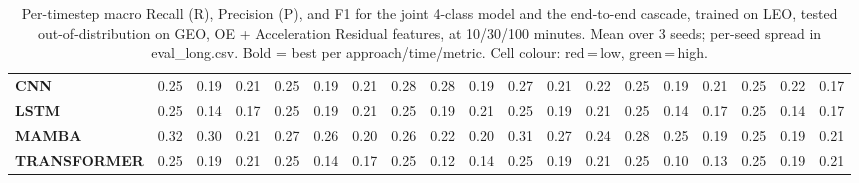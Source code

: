 \begin{table}[t]
{\begin{tabular}{l ccc ccc ccc ccc ccc ccc}
\textbf{CNN} & \cellcolor[HTML]{FF6B6B}0.25 & \cellcolor[HTML]{FF6B6B}0.19 & \cellcolor[HTML]{FF6B6B}0.21 & \cellcolor[HTML]{FF6B6B}0.25 & \cellcolor[HTML]{FF6B6B}0.19 & \cellcolor[HTML]{FF6B6B}0.21 & \cellcolor[HTML]{FF7965}0.28 & \cellcolor[HTML]{FF7A64}0.28 & \cellcolor[HTML]{FF6B6B}0.19 & \cellcolor[HTML]{FF7367}0.27 & \cellcolor[HTML]{FF6B6B}0.21 & \cellcolor[HTML]{FF6B6B}0.22 & \cellcolor[HTML]{FF6B6B}0.25 & \cellcolor[HTML]{FF6B6B}0.19 & \cellcolor[HTML]{FF6B6B}0.21 & \cellcolor[HTML]{FF6B6B}0.25 & \cellcolor[HTML]{FF6B6B}0.22 & \cellcolor[HTML]{FF6B6B}0.17 \\
\textbf{LSTM} & \cellcolor[HTML]{FF6B6B}0.25 & \cellcolor[HTML]{FF6B6B}0.14 & \cellcolor[HTML]{FF6B6B}0.17 & \cellcolor[HTML]{FF6B6B}0.25 & \cellcolor[HTML]{FF6B6B}0.19 & \cellcolor[HTML]{FF6B6B}0.21 & \cellcolor[HTML]{FF6B6B}0.25 & \cellcolor[HTML]{FF6B6B}0.19 & \cellcolor[HTML]{FF6B6B}0.21 & \cellcolor[HTML]{FF6B6B}0.25 & \cellcolor[HTML]{FF6B6B}0.19 & \cellcolor[HTML]{FF6B6B}0.21 & \cellcolor[HTML]{FF6B6B}0.25 & \cellcolor[HTML]{FF6B6B}0.14 & \cellcolor[HTML]{FF6B6B}0.17 & \cellcolor[HTML]{FF6B6B}0.25 & \cellcolor[HTML]{FF6B6B}0.14 & \cellcolor[HTML]{FF6B6B}0.17 \\
\textbf{MAMBA} & \cellcolor[HTML]{FF875E}0.32 & \cellcolor[HTML]{FF8061}0.30 & \cellcolor[HTML]{FF6B6B}0.21 & \cellcolor[HTML]{FF7566}0.27 & \cellcolor[HTML]{FF7069}0.26 & \cellcolor[HTML]{FF6B6B}0.20 & \cellcolor[HTML]{FF7168}0.26 & \cellcolor[HTML]{FF6B6B}0.22 & \cellcolor[HTML]{FF6B6B}0.20 & \cellcolor[HTML]{FF8360}0.31 & \cellcolor[HTML]{FF7567}0.27 & \cellcolor[HTML]{FF6B6B}0.24 & \cellcolor[HTML]{FF7666}0.28 & \cellcolor[HTML]{FF6C6B}0.25 & \cellcolor[HTML]{FF6B6B}0.19 & \cellcolor[HTML]{FF6B6B}0.25 & \cellcolor[HTML]{FF6B6B}0.19 & \cellcolor[HTML]{FF6B6B}0.21 \\
\textbf{TRANSFORMER} & \cellcolor[HTML]{FF6B6B}0.25 & \cellcolor[HTML]{FF6B6B}0.19 & \cellcolor[HTML]{FF6B6B}0.21 & \cellcolor[HTML]{FF6B6B}0.25 & \cellcolor[HTML]{FF6B6B}0.14 & \cellcolor[HTML]{FF6B6B}0.17 & \cellcolor[HTML]{FF6B6B}0.25 & \cellcolor[HTML]{FF6B6B}0.12 & \cellcolor[HTML]{FF6B6B}0.14 & \cellcolor[HTML]{FF6B6B}0.25 & \cellcolor[HTML]{FF6B6B}0.19 & \cellcolor[HTML]{FF6B6B}0.21 & \cellcolor[HTML]{FF6B6B}0.25 & \cellcolor[HTML]{FF6B6B}0.10 & \cellcolor[HTML]{FF6B6B}0.13 & \cellcolor[HTML]{FF6B6B}0.25 & \cellcolor[HTML]{FF6B6B}0.19 & \cellcolor[HTML]{FF6B6B}0.21 \\
\bottomrule
\end{tabular}%
}
\caption{Per-timestep macro Recall (R), Precision (P), and F1 for the joint 4-class model and the end-to-end cascade, trained on LEO, tested out-of-distribution on GEO, OE + Acceleration Residual features, at 10/30/100 minutes. Mean over 3 seeds; per-seed spread in eval\_long.csv. Bold = best per approach/time/metric. Cell colour: red\,=\,low, green\,=\,high.}
\label{tab:seq_leo_to_geo_ladder_jc}
\end{table}

